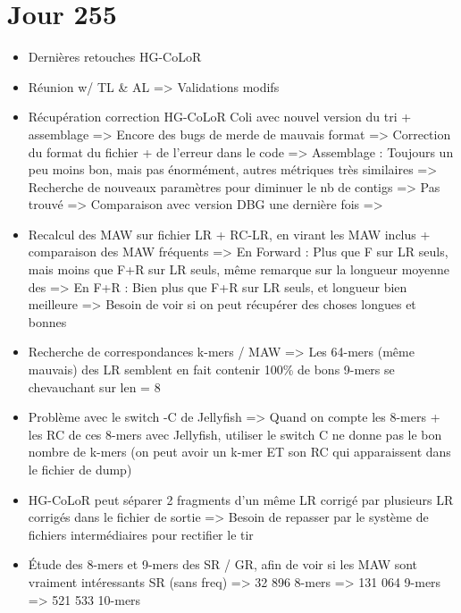 \documentclass[12pt]{report}
\begin{document}
\section{Jour 255}

\begin{itemize}
	\item Dernières retouches HG-CoLoR

	\item Réunion w/ TL \& AL => Validations modifs
	
	\item Récupération correction HG-CoLoR Coli avec nouvel version du tri + assemblage 
		  => Encore des bugs de merde de mauvais format => Correction du format du fichier + de l'erreur dans le code
		  => Assemblage : Toujours un peu moins bon, mais pas énormément, autres métriques très similaires
		  => Recherche de nouveaux paramètres pour diminuer le nb de contigs => Pas trouvé
		  => Comparaison avec version DBG une dernière fois => 
		  
	\item Recalcul des MAW sur fichier LR + RC-LR, en virant les MAW inclus + comparaison des MAW fréquents
		  => En Forward : Plus que F sur LR seuls, mais moins que F+R sur LR seuls, même remarque sur la longueur moyenne des
		  => En F+R : Bien plus que F+R sur LR seuls, et longueur bien meilleure
		  => Besoin de voir si on peut récupérer des choses longues et bonnes
		  
	\item Recherche de correspondances k-mers / MAW
		  => Les 64-mers (même mauvais) des LR semblent en fait contenir 100\% de bons 9-mers se chevauchant sur len = 8
	
	\item Problème avec le switch -C de Jellyfish
		  => Quand on compte les 8-mers + les RC de ces 8-mers avec Jellyfish, utiliser le switch C ne donne pas le bon nombre de k-mers
		  	 (on peut avoir un k-mer ET son RC qui apparaissent dans le fichier de dump)
		  	 
	\item HG-CoLoR peut séparer 2 fragments d'un même LR corrigé par plusieurs LR corrigés dans le fichier de sortie
		  => Besoin de repasser par le système de fichiers intermédiaires pour rectifier le tir
		  
	\item Étude des 8-mers et 9-mers des SR / GR, afin de voir si les MAW sont vraiment intéressants
		  SR (sans freq) => 32 896 8-mers
		     			=> 131 064 9-mers
		     			=> 521 533 10-mers


\end{itemize}
\end{document}
